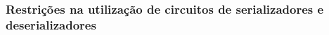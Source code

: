 %


\subsubsection*{Restrições na utilização de circuitos de serializadores e deserializadores} \label{subsub:restricoes_circuitos}
	

